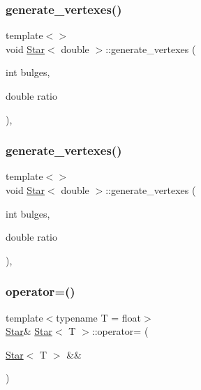 \mbox{\label{classStar_a85d8438cea72701a136b76f046ee95dd}} 
\subsubsection{\texorpdfstring{generate\+\_\+vertexes()}{generate\_vertexes()}\hspace{0.1cm}{\footnotesize\ttfamily [5/6]}}
{\footnotesize\ttfamily template$<$$>$ \\
void \mbox{\hyperlink{classStar}{Star}}$<$ double $>$\+::generate\+\_\+vertexes (\begin{DoxyParamCaption}\item[{int}]{bulges,  }\item[{double}]{ratio }\end{DoxyParamCaption})\hspace{0.3cm}{\ttfamily [inline]}, {\ttfamily [private]}}

\mbox{\label{classStar_a85d8438cea72701a136b76f046ee95dd}} 
\subsubsection{\texorpdfstring{generate\+\_\+vertexes()}{generate\_vertexes()}\hspace{0.1cm}{\footnotesize\ttfamily [6/6]}}
{\footnotesize\ttfamily template$<$$>$ \\
void \mbox{\hyperlink{classStar}{Star}}$<$ double $>$\+::generate\+\_\+vertexes (\begin{DoxyParamCaption}\item[{int}]{bulges,  }\item[{double}]{ratio }\end{DoxyParamCaption})\hspace{0.3cm}{\ttfamily [inline]}, {\ttfamily [private]}}

\mbox{\label{classStar_a7113d2808314f0aa2f5a87325f8c535d}} 
\subsubsection{\texorpdfstring{operator=()}{operator=()}\hspace{0.1cm}{\footnotesize\ttfamily [1/4]}}
{\footnotesize\ttfamily template$<$typename T  = float$>$ \\
\mbox{\hyperlink{classStar}{Star}}\& \mbox{\hyperlink{classStar}{Star}}$<$ T $>$\+::operator= (\begin{DoxyParamCaption}\item[{\mbox{\hyperlink{classStar}{Star}}$<$ T $>$ \&\&}]{ }\end{DoxyParamCaption})\hspace{0.3cm}{\ttfamily [default]}}

